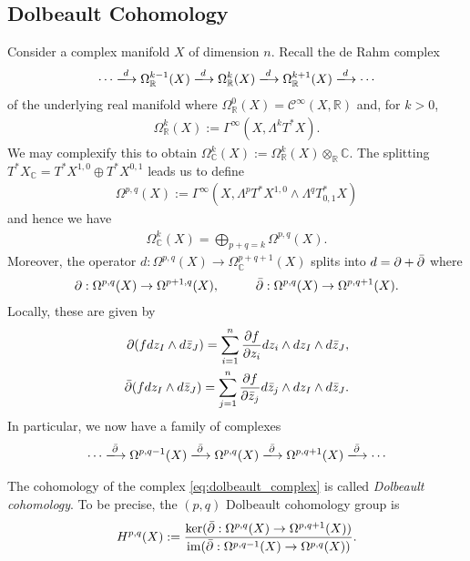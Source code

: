 \documentclass[12pt]{ociamthesis}  %
\begin{document}
\subsection{Dolbeault Cohomology}

Consider a complex manifold $X$ of dimension $n$. Recall the de Rahm
complex
\begin{align*}
  \cdots \xlongrightarrow{d}
  \Omega_{\mathbb{R}}^{k-1}(X)\xlongrightarrow{d}
  \Omega_{\mathbb{R}}^{k}(X)\xlongrightarrow{d}
  \Omega_{\mathbb{R}}^{k+1}(X)\xlongrightarrow{d}
  \cdots
\end{align*}
of the underlying real manifold where
$\Omega^0_{\mathbb{R}}(X) = \mathscr C^\infty(X,\mathbb{R})$ and,
for $k > 0$,
\begin{align*}
  \Omega^k_{\mathbb{R}}(X) := \Gamma^\infty(X,\Lambda^k T^*X).
\end{align*}
We may complexify this to obtain
$\Omega^k_{\mathbb C}(X) := \Omega^k_{\mathbb R}(X)\otimes_{\mathbb{R}} \mathbb{C}$.
The splitting $T^*X_\mathbb{C} = T^*X^{1,0} \oplus T^*X^{0,1}$
leads us to define
\begin{align*}
  \Omega^{p,q}(X)
  := \Gamma^\infty(X,\Lambda^p T^*X^{1,0} \wedge\Lambda^q T^*_{0,1}X)
\end{align*}
and hence we have
\begin{align*}
  \Omega^k_{\mathbb C}(X) = \bigoplus_{p+q=k} \Omega^{p,q}(X).
\end{align*}
Moreover, the operator $d : \Omega^{p,q}(X) \to \Omega^{p+q+1}_{\mathbb C}(X)$
splits into $d = \partial + {\bar{\partial}}$ where
\begin{align*}
  \partial : \Omega^{p,q}(X) \to \Omega^{p+1,q}(X),\hspace{1cm}
  {\bar{\partial}} : \Omega^{p,q}(X) \to \Omega^{p,q+1}(X).
\end{align*}
Locally, these are given by
\begin{align*}
  \partial (f dz_I \wedge d\bar z_J) = \sum_{i=1}^n \frac{\partial f}{\partial z_i} dz_i\wedge dz_I \wedge d\bar z_J, \\
  {\bar{\partial}} (f dz_I \wedge d\bar z_J) = \sum_{j=1}^n \frac{\partial f}{\partial \bar z_j} d\bar z_j\wedge dz_I \wedge d\bar z_J.
\end{align*}
In particular, we now have a family of complexes
\begin{align}\label{eq:dolbeault_complex}
  \cdots \xlongrightarrow\dol
  \Omega^{p,q-1}(X)\xlongrightarrow\dol
  \Omega^{p,q}(X)\xlongrightarrow\dol
  \Omega^{p,q+1}(X)\xlongrightarrow\dol
  \cdots
\end{align}
\begin{definition}
  The cohomology of the complex \ref{eq:dolbeault_complex} is
  called \emph{Dolbeault cohomology}. To be precise, the
  $(p,q)$ Dolbeault cohomology group is
  \begin{align*}
    H^{p,q}(X) := \frac{
      \ker({\bar{\partial}} : \Omega^{p,q}(X) \to \Omega^{p,q+1}(X))
    }{
      \operatorname{im}({\bar{\partial}} : \Omega^{p,q-1}(X) \to \Omega^{p,q}(X))
    }.
  \end{align*}
\end{definition}
\end{document}
